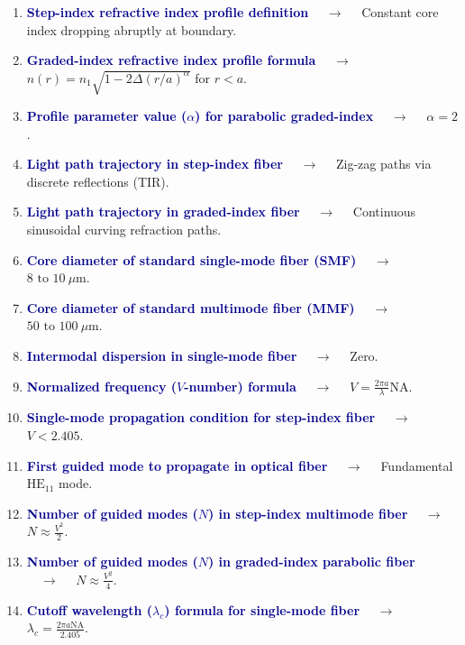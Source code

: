 \documentclass[11pt,a4paper]{article}
\begin{document}
\begin{enumerate}[label=\arabic*., leftmargin=*, labelsep=0.8em, itemsep=0.35em, parsep=0.1em, topsep=0.2em]
  \item \textcolor{darkblue}{\textbf{Step-index refractive index profile definition}} $\quad\to\quad$ Constant core index dropping abruptly at boundary.
  \item \textcolor{darkblue}{\textbf{Graded-index refractive index profile formula}} $\quad\to\quad$ $n(r) = n_1 \sqrt{1 - 2\Delta(r/a)^\alpha}$ for $r < a$.
  \item \textcolor{darkblue}{\textbf{Profile parameter value ($\alpha$) for parabolic graded-index}} $\quad\to\quad$ $\alpha = 2$.
  \item \textcolor{darkblue}{\textbf{Light path trajectory in step-index fiber}} $\quad\to\quad$ Zig-zag paths via discrete reflections (TIR).
  \item \textcolor{darkblue}{\textbf{Light path trajectory in graded-index fiber}} $\quad\to\quad$ Continuous sinusoidal curving refraction paths.
  \item \textcolor{darkblue}{\textbf{Core diameter of standard single-mode fiber (SMF)}} $\quad\to\quad$ $8 \text{ to } 10\ \mu\text{m}$.
  \item \textcolor{darkblue}{\textbf{Core diameter of standard multimode fiber (MMF)}} $\quad\to\quad$ $50 \text{ to } 100\ \mu\text{m}$.
  \item \textcolor{darkblue}{\textbf{Intermodal dispersion in single-mode fiber}} $\quad\to\quad$ Zero.
  \item \textcolor{darkblue}{\textbf{Normalized frequency ($V$-number) formula}} $\quad\to\quad$ $V = \frac{2\pi a}{\lambda}\text{NA}$.
  \item \textcolor{darkblue}{\textbf{Single-mode propagation condition for step-index fiber}} $\quad\to\quad$ $V < 2.405$.
  \item \textcolor{darkblue}{\textbf{First guided mode to propagate in optical fiber}} $\quad\to\quad$ Fundamental $\text{HE}_{11}$ mode.
  \item \textcolor{darkblue}{\textbf{Number of guided modes ($N$) in step-index multimode fiber}} $\quad\to\quad$ $N \approx \frac{V^2}{2}$.
  \item \textcolor{darkblue}{\textbf{Number of guided modes ($N$) in graded-index parabolic fiber}} $\quad\to\quad$ $N \approx \frac{V^2}{4}$.
  \item \textcolor{darkblue}{\textbf{Cutoff wavelength ($\lambda_c$) formula for single-mode fiber}} $\quad\to\quad$ $\lambda_c = \frac{2\pi a \text{NA}}{2.405}$.

\end{enumerate}
\end{document}
